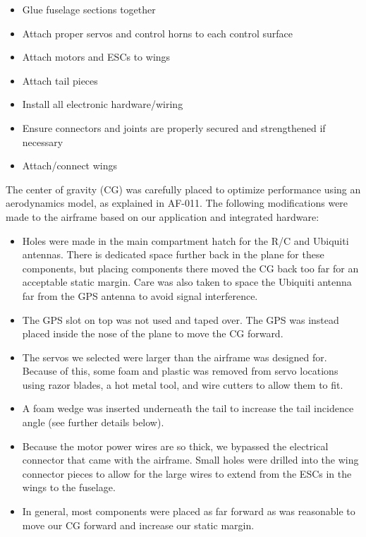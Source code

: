 \documentclass[]{auvsi_doc}
\begin{document}
\begin{itemize}
	\item Glue fuselage sections together
	\item Attach proper servos and control horns to each control surface
	\item Attach motors and ESCs to wings
	\item Attach tail pieces
	\item Install all electronic hardware/wiring
	\item Ensure connectors and joints are properly secured and strengthened if necessary
	\item Attach/connect wings
\end{itemize}

The center of gravity (CG) was carefully placed to optimize performance using an aerodynamics model, as explained in AF-011. The following modifications were made to the airframe based on our application and integrated hardware:

\begin{itemize}
	\item Holes were made in the main compartment hatch for the R/C and Ubiquiti antennas. There is dedicated space further back in the plane for these components, but placing components there moved the CG back too far for an acceptable static margin. Care was also taken to space the Ubiquiti antenna far from the GPS antenna to avoid signal interference.
	\item The GPS slot on top was not used and taped over. The GPS was instead placed inside the nose of the plane to move the CG forward.
	\item The servos we selected were larger than the airframe was designed for. Because of this, some foam and plastic was removed from servo locations using razor blades, a hot metal tool, and wire cutters to allow them to fit.
	\item A foam wedge was inserted underneath the tail to increase the tail incidence angle (see further details below).
	\item Because the motor power wires are so thick, we bypassed the electrical connector that came with the airframe. Small holes were drilled into the wing connector pieces to allow for the large wires to extend from the ESCs in the wings to the fuselage. 
	\item In general, most components were placed as far forward as was reasonable to move our CG forward and increase our static margin. 
\end{itemize}
\end{document}
